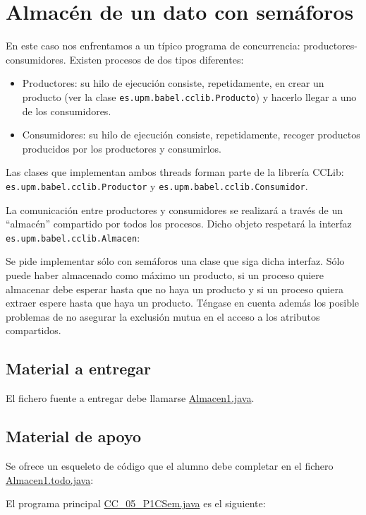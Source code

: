 \documentclass{article}
\begin{document}
\section{Almacén de un dato con semáforos}
En este caso nos enfrentamos a un típico programa de concurrencia:
productores-consumidores. Existen procesos de dos tipos diferentes:
\begin{itemize}
\item Productores: su hilo de ejecución consiste, repetidamente, en
  crear un producto (ver la clase \lstinline{es.upm.babel.cclib.Producto}) y
  hacerlo llegar a uno de los consumidores.
\item Consumidores: su hilo de ejecución consiste, repetidamente,
  recoger productos producidos por los productores y consumirlos.
\end{itemize}
Las clases que implementan ambos threads forman parte de la librería
CCLib:
\newline
\lstinline{es.upm.babel.cclib.Productor} y
\lstinline{es.upm.babel.cclib.Consumidor}.

La comunicación entre productores y consumidores se realizará a través
de un ``almacén'' compartido por todos los procesos. Dicho objeto
respetará la interfaz \lstinline{es.upm.babel.cclib.Almacen}:


Se pide implementar sólo con semáforos una clase que siga dicha
interfaz. Sólo puede haber almacenado como máximo un producto, si un
proceso quiere almacenar debe esperar hasta que no haya un producto y
si un proceso quiera extraer espere hasta que haya un
producto. Téngase en cuenta además los posible problemas de no
asegurar la exclusión mutua en el acceso a los atributos
compartidos.

\subsection*{Material a entregar}
El fichero fuente a entregar debe llamarse \url{Almacen1.java}.

\subsection*{Material de apoyo}
Se ofrece un esqueleto de código que el alumno debe completar en el fichero
\url{Almacen1.todo.java}:


El programa principal \url{CC_05_P1CSem.java} es el siguiente:

\end{document}
